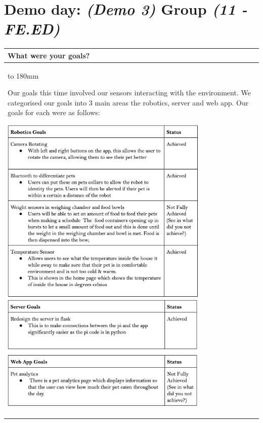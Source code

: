 \documentclass[a4paper]{article}
\newcommand{\colWidth}{141mm}
\begin{document}
 
\section*{Demo day: \textit{(Demo 3)} Group \textit{(11 - FE.ED)}}


\begin{center}
\begin{tabular}{|p{\colWidth}|}
	\hline
	\cellcolor{blue!25}\large
	\textbf{What were your goals?}
	\\ \hline
	\vtop to 180mm{
Our goals this time involved our sensors interacting with the environment. We categorised our goals into 3 main areas the robotics, server and  web app.
Our goals for each were as follows: 

 \includegraphics[width=10cm]{robot.png}
 \includegraphics[width=10cm]{server.png}
 \includegraphics[width=10cm]{app.png}
  }
  \\
  \hline
\end{tabular}
\vskip 5mm




\end{center}
\end{document}
